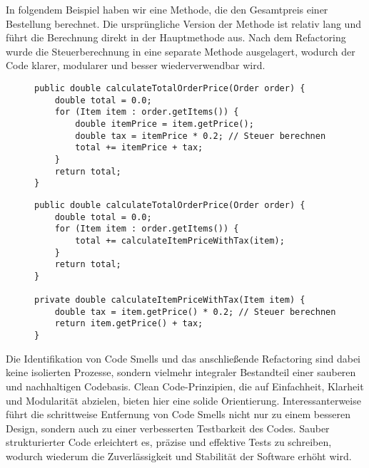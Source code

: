 \documentclass[conference]{IEEEtran}
\begin{document}
 In folgendem Beispiel haben wir eine Methode, die den Gesamtpreis einer Bestellung berechnet. Die ursprüngliche Version der Methode ist relativ lang und führt die Berechnung direkt in der Hauptmethode aus. Nach dem Refactoring wurde die Steuerberechnung in eine separate Methode ausgelagert, wodurch der Code klarer, modularer und besser wiederverwendbar wird.
\begin{figure}[h]
    \centering
    \begin{minipage}{0.45\textwidth} %
        \begin{lstlisting}[caption=Vor Refactoring: Long Method, label=code:long_method]
public double calculateTotalOrderPrice(Order order) {
    double total = 0.0;
    for (Item item : order.getItems()) {
        double itemPrice = item.getPrice();
        double tax = itemPrice * 0.2; // Steuer berechnen
        total += itemPrice + tax;
    }
    return total;
}
        \end{lstlisting}
    \end{minipage}
    \vspace{1em}
    \begin{minipage}{0.45\textwidth} %
        \begin{lstlisting}[caption=Nach Refactoring: Methoden extrahiert, label=code:refactored_method]
public double calculateTotalOrderPrice(Order order) {
    double total = 0.0;
    for (Item item : order.getItems()) {
        total += calculateItemPriceWithTax(item);
    }
    return total;
}

private double calculateItemPriceWithTax(Item item) {
    double tax = item.getPrice() * 0.2; // Steuer berechnen
    return item.getPrice() + tax;
}
        \end{lstlisting}
    \end{minipage}
\end{figure}

Die Identifikation von Code Smells und das anschließende Refactoring sind dabei keine isolierten Prozesse, sondern vielmehr integraler Bestandteil einer sauberen und nachhaltigen Codebasis. Clean Code-Prinzipien, die auf Einfachheit, Klarheit und Modularität abzielen, bieten hier eine solide Orientierung. Interessanterweise führt die schrittweise Entfernung von Code Smells nicht nur zu einem besseren Design, sondern auch zu einer verbesserten Testbarkeit des Codes. Sauber strukturierter Code erleichtert es, präzise und effektive Tests zu schreiben, wodurch wiederum die Zuverlässigkeit und Stabilität der Software erhöht wird.\\
\end{document}

